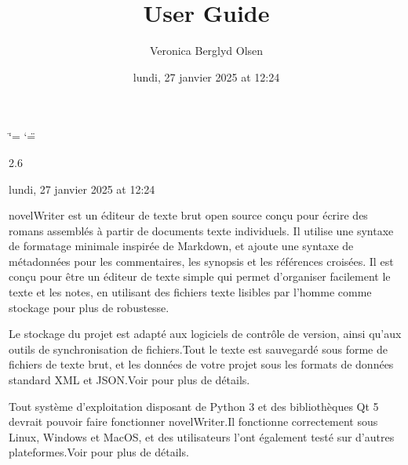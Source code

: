 \documentclass[a4paper,11pt,french]{sphinxmanual}
\title{User Guide}
\date{lundi, 27 janvier 2025 at 12:24}
\author{Veronica Berglyd Olsen}
\let\sphinxpxdimen\pdfpxdimen\else\newdimen\sphinxpxdimen
\begin{document}
\ifdefined\shorthandoff
  \ifnum\catcode`\=\string=\active\shorthandoff{=}\fi
  \ifnum\catcode`\"=\active{}\fi
\fi

\pagestyle{empty}
\sphinxmaketitle
\pagestyle{plain}
\sphinxtableofcontents
\pagestyle{normal}
\label{\detokenize{index::doc}}


\begin{DUlineblock}{0em}
\item[]  2.6
\item[]  lundi, 27 janvier 2025 at 12:24
\end{DUlineblock}

\sphinxAtStartPar
novelWriter est un éditeur de texte brut open source conçu pour écrire des romans assemblés à partir de documents texte individuels. Il utilise une syntaxe de formatage minimale inspirée de Markdown, et ajoute une syntaxe de métadonnées pour les commentaires, les synopsis et les références croisées. Il est conçu pour être un éditeur de texte simple qui permet d’organiser facilement le texte et les notes, en utilisant des fichiers texte lisibles par l’homme comme stockage pour plus de robustesse.

\begin{figure}[htbp]
\centering

\noindent\sphinxincludegraphics[width=500\sphinxpxdimen]{{screenshot_multi}.png}
\end{figure}

\sphinxAtStartPar
Le stockage du projet est adapté aux logiciels de contrôle de version, ainsi qu’aux outils de synchronisation de fichiers.Tout le texte est sauvegardé sous forme de fichiers de texte brut, et les données de votre projet sous les formats de données standard XML et JSON.Voir {\hyperref[\detokenize{tech_storage:a-storage}]{}} pour plus de détails.

\sphinxAtStartPar
Tout système d’exploitation disposant de Python 3 et des bibliothèques Qt 5 devrait pouvoir faire fonctionner novelWriter.Il fonctionne correctement sous Linux, Windows et MacOS, et des utilisateurs l’ont également testé sur d’autres plateformes.Voir {\hyperref[\detokenize{int_started:a-started}]{}} pour plus de détails.
\end{document}
